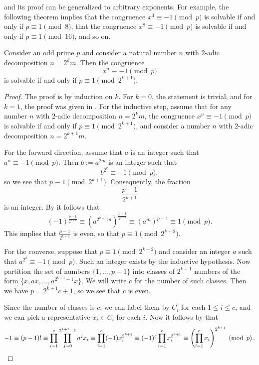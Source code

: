  and its proof can be generalized to arbitrary exponents. For example, the following theorem implies that the congruence $x^4\equiv -1\pmod{p}$ is solvable if and only if $p\equiv 1\pmod{8}$, that the congruence $x^8\equiv -1\pmod{p}$ is solvable if and only if $p\equiv 1\pmod{16}$, and so on.

\begin{theorem}
  Consider an odd prime $p$ and consider a natural number $n$ with $2$-adic decomposition $n=2^km$. Then the congruence
  \begin{equation*}
    x^n \equiv -1\pmod{p}
  \end{equation*}
  is solvable if and only if $p\equiv 1\pmod{2^{k+1}}$.
\end{theorem}

\begin{proof}
  The proof is by induction on $k$. For $k=0$, the statement is trivial, and for $k=1$, the proof was given in . For the inductive step, assume that for any number $n$ with $2$-adic decomposition $n=2^km$, the congruence $x^n\equiv-1\pmod{p}$ is solvable if and only if $p\equiv 1\pmod{2^{k+1}}$, and consider a number $n$ with $2$-adic decomposition $n=2^{k+1}m$.

  For the forward direction, assume that $a$ is an integer such that $a^n\equiv -1\pmod{p}$. Then $b:=a^{2m}$ is an integer such that
  \begin{equation*}
    b^{2^k}\equiv -1\pmod{p},
  \end{equation*}
  so we see that $p\equiv 1\pmod{2^{k+1}}$. Consequently, the fraction
  \begin{equation*}
    \frac{p-1}{2^{k+1}}
  \end{equation*}
  is an integer. By  it follows that
  \begin{equation*}
    (-1)^{\frac{p-1}{2^{k+1}}}\equiv(a^{2^{k+1}m})^{\frac{p-1}{2^{k+1}}}\equiv (a^m)^{p-1}\equiv 1\pmod{p}.
  \end{equation*}
  This implies that $\frac{p-1}{2^{k+1}}$ is even, so that $p\equiv 1\pmod{2^{k+2}}$.

  For the converse, suppose that $p\equiv 1\pmod{2^{k+2}}$ and consider an integer $a$ such that $a^{2^k}\equiv -1\pmod{p}$. Such an integer exists by the inductive hypothesis. Now partition the set of numbers $\{1,\ldots,p-1\}$ into classes of $2^{k+1}$ numbers of the form $\{x,ax,\ldots,a^{2^{k+1}-1}x\}$. We will write $c$ for the number of such classes. Then we have $p=2^{k+1}c+1$, so we see that $c$ is even.

  Since the number of classes is $c$, we can label them by $C_i$ for each $1\leq i\leq c$, and we can pick a representative $x_i\in C_i$ for each $i$. Now it follows by  that
  \begin{equation*}
    -1\equiv (p-1)!\equiv \prod_{i=1}^c \prod_{j=0}^{2^{k+1}-1} a^jx_i \equiv \prod_{i=1}^c (-1)x_i^{2^{k+1}} \equiv (-1)^c\prod_{i=1}^c x_i^{2^{k+1}} \equiv \left(\prod_{i=1}^c x_i\right)^{2^{k+1}}\pmod{p}.\qedhere
  \end{equation*}
\end{proof}

